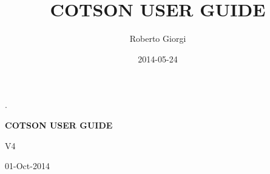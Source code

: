 \documentclass[a4paper]{article}
\title{COTSON USER GUIDE}
\author{Roberto Giorgi}
\date{2014-05-24}
\begin{document}
.

\bigskip


\bigskip


\bigskip


\bigskip


\bigskip


\bigskip


\bigskip


\bigskip


\bigskip

{\centering{}\bfseries
\Huge COTSON USER GUIDE
\bigskip
\par}

{\centering{}
V4
\par}

{\centering{}
01-Oct-2014
\par}


\bigskip
\end{document}
